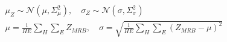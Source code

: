 ﻿\documentclass{article}
\begin{document}
\begin{preview}
\(\displaystyle
\begin{gathered}
  \mu_Z \sim \mathcal{N}(\mu,\Sigma_{\mu}^{2}),
  \quad
  \sigma_Z \sim \mathcal{N}(\sigma,\Sigma_{\sigma}^{2}) \\
  \mu = \frac{1}{HE}\sum_H\sum_E Z_{MRB}, \quad
  \sigma = \sqrt{\frac{1}{HE}\sum_H\sum_E (Z_{MRB}-\mu)^2}
\end{gathered}
\)
\end{preview}
\end{document}
